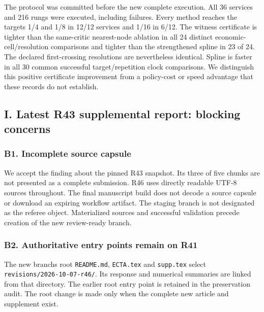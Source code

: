 \documentclass[ecta,nameyear,draft]{econsocart}
\begin{document}
The protocol was committed before the new complete execution. All 36
services and 216 rungs were executed, including failures. Every method
reaches the targets 1/4 and 1/8 in 12/12 services and 1/16 in 6/12. The
witness certificate is tighter than the same-critic nearest-node
ablation in all 24 distinct economic-cell/resolution comparisons and
tighter than the strengthened spline in 23 of 24. The declared
first-crossing resolutions are nevertheless identical. Spline is faster
in all 30 common successful target/repetition clock comparisons. We
distinguish this positive certificate improvement from a policy-cost or
speed advantage that these records do not establish.

\hypertarget{i-latest-r43-supplemental-report-blocking-concerns}{%
\subsection{I. Latest R43 supplemental report: blocking
concerns}\label{i-latest-r43-supplemental-report-blocking-concerns}}

\hypertarget{b1-incomplete-source-capsule}{%
\subsubsection{B1. Incomplete source
capsule}\label{b1-incomplete-source-capsule}}

We accept the finding about the pinned R43 snapshot. Its three of five
chunks are not presented as a complete submission. R46 uses directly
readable UTF-8 sources throughout. The final manuscript build does not
decode a source capsule or download an expiring workflow artifact. The
staging branch is not designated as the referee object. Materialized
sources and successful validation precede creation of the new
review-ready branch.

\hypertarget{b2-authoritative-entry-points-remain-on-r41}{%
\subsubsection{B2. Authoritative entry points remain on
R41}\label{b2-authoritative-entry-points-remain-on-r41}}

The new branch\textquotesingle s root \nolinkurl{README.md},
\nolinkurl{ECTA.tex} and \nolinkurl{supp.tex} select
\nolinkurl{revisions/2026-10-07-r46/}. Its response and numerical summaries
are linked from that directory. The earlier root entry point is retained
in the preservation audit. The root change is made only when the
complete new article and supplement exist.
\end{document}
